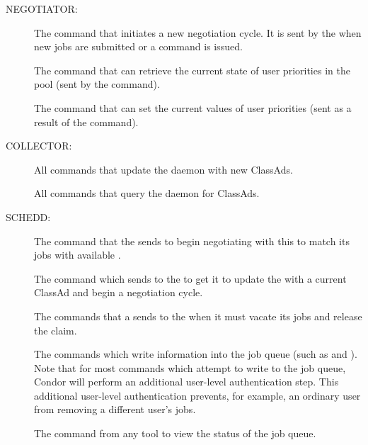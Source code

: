 NEGOTIATOR:

\begin{description}
\item[]
The command that initiates a new negotiation
  cycle. It is sent by the  when new jobs are submitted
  or a  command is issued.

\item[]
The command that can retrieve the current state
  of user priorities in the pool (sent by the  command).

\item[]
The command that can set the current
  values of user priorities (sent as a result of the 
  command).
\end{description}

COLLECTOR:

\begin{description}
\item[]
All commands that update the  daemon with new ClassAds.

\item[]
All commands that query the  daemon for ClassAds.
\end{description}

SCHEDD: 

\begin{description}
\item[]
The command that the  sends to
  begin negotiating with this  to match its jobs with available
  .

\item[]
The command which  sends to
  the  to get it to update the  with a current ClassAd
  and begin a negotiation cycle.

  The commands that a  sends to the  when it must vacate
  its jobs and release the  claim.

  The commands which write information into the job queue (such as
   and ).  
  Note that for most commands which attempt to write to the job queue, Condor
  will perform an additional user-level authentication step.  
  This additional user-level authentication prevents, for example, an
  ordinary user from removing a different user's jobs.

\item[]
The command from any
  tool to view the status of the job queue.  
\end{description}

